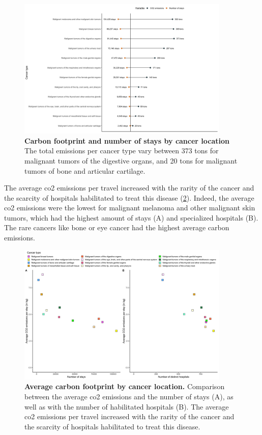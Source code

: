 \begin{figure}[h!]
    \includegraphics[width=0.9\textwidth]{images/routes/fig12.png}
    \centering
    \caption{
        \textbf{Carbon footprint and number of stays by cancer location}
        The total emissions per cancer type vary between 373 tons for
        malignant tumors of the digestive organs, and 20 tons for malignant tumors
        of bone and articular cartilage.}
    \label{fig:carbon-footprint-pathology}
\end{figure}

The average \ac{co2} emissions per travel increased with the rarity of the
cancer and the scarcity of hospitals habilitated to treat this disease
(\cref{fig:avg-carbon-footprint-pathology}). Indeed, the average \ac{co2}
emissions were the lowest for malignant melanoma and other malignant skin
tumors, which had the highest amount of stays (A) and specialized hospitals
(B). The rare cancers like bone or eye cancer had the highest average
carbon emissions.

\begin{figure}[h!]
    \includegraphics[width=0.9\textwidth]{images/routes/sup_fig_4.png}
    \centering
    \caption{ \textbf{Average carbon footprint by cancer location.} Comparison
        between the average \ac{co2} emissions and the number of stays (A), as
        well as with the number of habilitated hospitals (B). The average
        \ac{co2} emissions per travel increased with the rarity of the cancer
        and the scarcity of hospitals habilitated to treat this disease. }
    \label{fig:avg-carbon-footprint-pathology}
\end{figure}

